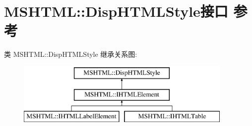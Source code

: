 \hypertarget{interface_m_s_h_t_m_l_1_1_disp_h_t_m_l_style}{}\section{M\+S\+H\+T\+ML\+:\+:Disp\+H\+T\+M\+L\+Style接口 参考}
\label{interface_m_s_h_t_m_l_1_1_disp_h_t_m_l_style}
类 M\+S\+H\+T\+ML\+:\+:Disp\+H\+T\+M\+L\+Style 继承关系图\+:\begin{figure}[H]
\begin{center}
\leavevmode
\includegraphics[height=3.000000cm]{interface_m_s_h_t_m_l_1_1_disp_h_t_m_l_style}
\end{center}
\end{figure}
